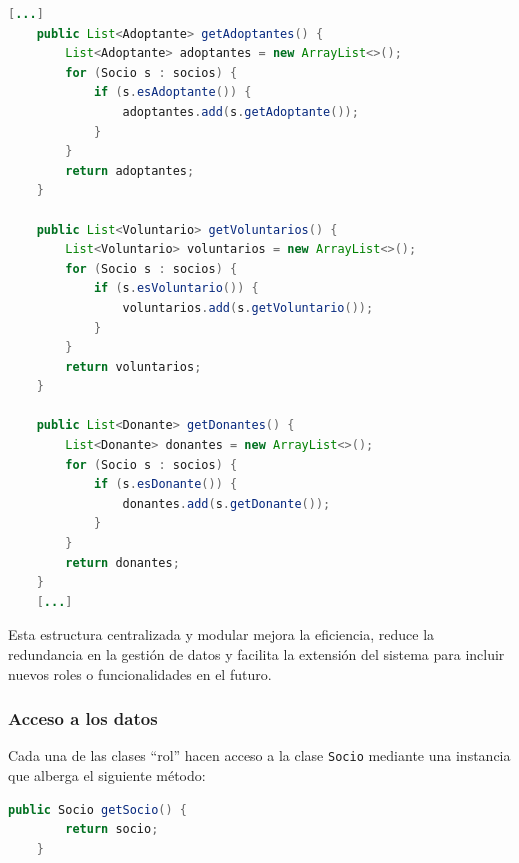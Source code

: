 \begin{lstlisting}[style = javaNormal, language=Java, caption={extracto de la clase Refugio}] 
    [...]
    public List<Adoptante> getAdoptantes() {
        List<Adoptante> adoptantes = new ArrayList<>();
        for (Socio s : socios) {
            if (s.esAdoptante()) {
                adoptantes.add(s.getAdoptante());
            }
        }
        return adoptantes;
    }

    public List<Voluntario> getVoluntarios() {
        List<Voluntario> voluntarios = new ArrayList<>();
        for (Socio s : socios) {
            if (s.esVoluntario()) {
                voluntarios.add(s.getVoluntario());
            }
        }
        return voluntarios;
    }

    public List<Donante> getDonantes() {
        List<Donante> donantes = new ArrayList<>();
        for (Socio s : socios) {
            if (s.esDonante()) {
                donantes.add(s.getDonante());
            }
        }
        return donantes;
    }
    [...]
\end{lstlisting}

Esta estructura centralizada y modular mejora la eficiencia, reduce la redundancia en la gestión de datos y facilita la 
extensión del sistema para incluir nuevos roles o funcionalidades en el futuro.

\subsubsection{Acceso a los datos}
Cada una de las clases \enquote{rol} hacen acceso a la clase \texttt{Socio} mediante una instancia que alberga el siguiente método:

\begin{lstlisting}[style = javaNormal, language=Java] 
public Socio getSocio() {
        return socio;
    }
\end{lstlisting}


